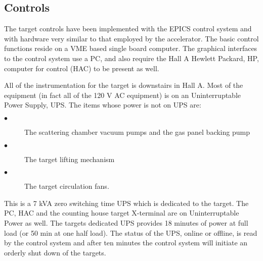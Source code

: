 {\subsection{ Controls}

The target controls have been implemented with the EPICS control
system and with hardware very similar to that employed by the accelerator.
The basic control functions reside on a VME based single board
computer. The graphical interfaces to the control system use a PC, and
also require the Hall A Hewlett Packard, HP, computer for control (HAC)
to be present as well.

All of the instrumentation for the target is downstairs in Hall A.
Most of the equipment (in fact all of the 120 V AC equipment) is
on an Uninterruptable Power Supply, UPS. The items whose power
is not on UPS are:
\begin{description}
\item[$\bullet$] The scattering chamber vacuum pumps and the gas panel
backing pump
\item[$\bullet$] The target lifting mechanism
\item[$\bullet$] The target circulation fans.
\end{description}
This is a 7 kVA zero switching time
UPS which is dedicated to the target. The PC, HAC and the counting house target
X-terminal are on Uninterruptable Power as well. 
The targets dedicated UPS provides 18 minutes of power at full load
(or 50 min at one half load). The status of the UPS, online or offline,
is read by the control system and after ten minutes the control system
will initiate an orderly shut down of the targets.

}
